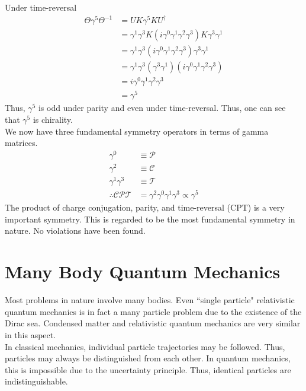 \documentclass[12pt,a4paper,titlepage]{article}
\begin{document}
Under time-reversal
\begin{equation}
\begin{aligned}
\Theta\gamma^{5}\Theta^{-1}&=UK\gamma^{5}KU^{\dagger}\\
&=\gamma^{1}\gamma^{3}K(i\gamma^{0}\gamma^{1}\gamma^{2}\gamma^{3})K\gamma^{3}\gamma^{1}\\
&=\gamma^{1}\gamma^{3}(i\gamma^{0}\gamma^{1}\gamma^{2}\gamma^{3})\gamma^{3}\gamma^{1}\\
&=\gamma^{1}\gamma^{3}(\gamma^{3}\gamma^{1})(i\gamma^{0}\gamma^{1}\gamma^{2}\gamma^{3})\\
&=i\gamma^{0}\gamma^{1}\gamma^{2}\gamma^{3}\\
&=\gamma^{5}
\end{aligned}
\end{equation}
Thus, $\gamma^{5}$ is odd under parity and even under time-reversal. Thus, one can see that $\gamma^{5}$ is chirality.\\

We now have three fundamental symmetry operators in terms of gamma matrices.
\begin{equation}
\begin{aligned}
\gamma^{0}&\equiv\mathcal{P}\\
\gamma^{2}&\equiv\mathcal{C}\\
\gamma^{1}\gamma^{3}&\equiv\mathcal{T}\\
\therefore\mathcal{C}\mathcal{P}\mathcal{T}&=\gamma^{2}\gamma^{0}\gamma^{1}\gamma^{3}\propto\gamma^{5}
\end{aligned}
\end{equation}
The product of charge conjugation, parity, and time-reversal (CPT) is a very important symmetry. This is regarded to be the most fundamental symmetry in nature. No violations have been found.

\newpage
\section{Many Body Quantum Mechanics}
Most problems in nature involve many bodies. Even ``single particle" relativistic quantum mechanics is in fact a many particle problem due to the existence of the Dirac sea. Condensed matter and relativistic quantum mechanics are very similar in this aspect.\\

In classical mechanics, individual particle trajectories may be followed. Thus, particles may always be distinguished from each other. In quantum mechanics, this is impossible due to the uncertainty principle. Thus, identical particles are indistinguishable.
\end{document}
